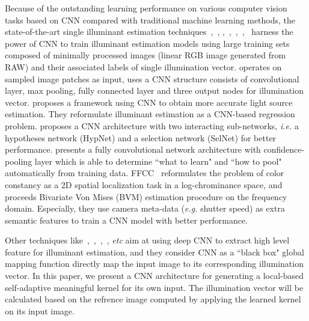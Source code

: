\documentclass[10pt,twocolumn,letterpaper]{article}
\begin{document}
Because of the outstanding learning performance on various computer vision tasks based on CNN
compared with traditional machine learning methods,
the state-of-the-art single illuminant estimation techniques~\cite{bianco2015color},~\cite{lou2015color},
\cite{shi2016deep},~\cite{hu2017fc},~\cite{DBLP:journals/corr/BarronT16},~\cite{bianco2015single},~\cite{gijsenij2012color}
harness the power of CNN to train illuminant estimation models using large training sets
composed of minimally processed images (linear RGB image generated from RAW) and
their associated labels of single illumination vector.
\cite{bianco2015color} operates on sampled image patches as input,
uses a CNN structure consists of convolutional layer, max pooling,
fully connected layer and three output nodes for illumination vector.
\cite{lou2015color} proposes a framework using CNN to obtain more accurate light source estimation.
They reformulate illuminant estimation as a CNN-based regression problem.
\cite{shi2016deep} proposes a CNN architecture with two interacting sub-networks,
\textit{i.e.} a hypotheses network (HypNet) and a selection network (SelNet) for better performance.
\cite{hu2017fc} presents a fully convolutional network architecture with confidence-pooling layer which
is able to determine ``what to learn" and ``how to pool" automatically from training data.
FFCC~\cite{DBLP:journals/corr/BarronT16} reformulates the problem of color constancy as
a 2D spatial localization task in a log-chrominance space,
and proceeds Bivariate Von Mises (BVM) estimation procedure on the frequency domain.
Especially, they use camera meta-data (\textit{e.g.} shutter speed) as extra semantic features to
train a CNN model with better performance.

Other techniques like~\cite{bianco2015color},~\cite{lou2015color},~\cite{shi2016deep},~\cite{hu2017fc}, \textit{etc} aim at
using deep CNN to extract high level feature for illuminant estimation,
and they consider CNN as a ``black box" global mapping function directly map the input image to its corresponding illumination vector.
In this paper, we present a CNN architecture for generating a local-based self-adaptive meaningful kernel for its own input.
The illumination vector will be calculated based on the refrence image computed by applying the learned kernel on its input image.
\end{document}
